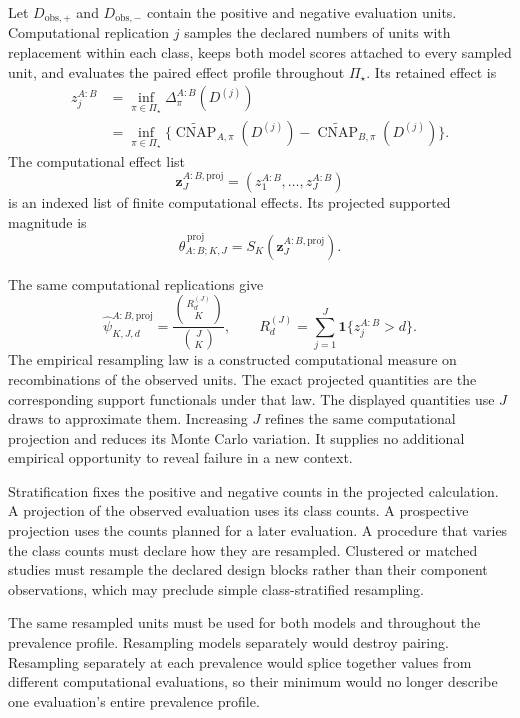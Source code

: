 \documentclass[11pt]{article}
\newcommand{\CNAP}{\operatorname{CNAP}}
\newcommand{\PSet}{\Pi_\star}
\newcommand{\CNAPta}{\widetilde{\CNAP}}
\theoremstyle{remark}
\begin{document}
Let $D_{\mathrm{obs},+}$ and $D_{\mathrm{obs},-}$ contain the positive and negative evaluation units. Computational replication $j$ samples the declared numbers of units with replacement within each class, keeps both model scores attached to every sampled unit, and evaluates the paired effect profile throughout $\PSet$. Its retained effect is
\[
\begin{aligned}
z_j^{A:B}
&=
\inf_{\pi\in\PSet}\Delta^{A:B}_\pi(D^{(j)}) \\
&=
\inf_{\pi\in\PSet}
\{\CNAPta_{A,\pi}(D^{(j)})-\CNAPta_{B,\pi}(D^{(j)})\}.
\end{aligned}
\]
The computational effect list
\[
\mathbf z_J^{A:B,\mathrm{proj}}
=
(z_1^{A:B},\ldots,z_J^{A:B})
\]
is an indexed list of finite computational effects. Its projected supported
magnitude is
\[
\widehat\theta_{A:B;K,J}^{\,\mathrm{proj}}
=
S_K\!\left(\mathbf z_J^{A:B,\mathrm{proj}}\right).
\]

The same computational replications give
\begin{equation}
\widehat\psi_{K,J,d}^{A:B,\mathrm{proj}}
=
\frac{\binom{R_d^{(J)}}{K}}{\binom{J}{K}},
\qquad
R_d^{(J)}=\sum_{j=1}^J\mathbf 1\{z_j^{A:B}>d\}.
\label{eq:projected-literal-survival}
\end{equation}
The empirical resampling law is a constructed computational measure on
recombinations of the observed units. The exact projected quantities are the
corresponding support functionals under that law. The displayed quantities use
$J$ draws to approximate them. Increasing $J$ refines the same computational
projection and reduces its Monte Carlo variation. It supplies no additional
empirical opportunity to reveal failure in a new context.

Stratification fixes the positive and negative counts in the projected calculation. A projection of the observed evaluation uses its class counts. A prospective projection uses the counts planned for a later evaluation. A procedure that varies the class counts must declare how they are resampled. Clustered or matched studies must resample the declared design blocks rather than their component observations, which may preclude simple class-stratified resampling.

The same resampled units must be used for both models and throughout the prevalence profile. Resampling models separately would destroy pairing. Resampling separately at each prevalence would splice together values from different computational evaluations, so their minimum would no longer describe one evaluation's entire prevalence profile.
\end{document}

